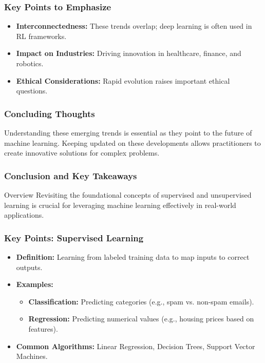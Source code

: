 \documentclass[aspectratio=169]{beamer}
\begin{document}
\begin{frame}[fragile]
    \frametitle{Key Points to Emphasize}
    \begin{itemize}
        \item \textbf{Interconnectedness:} These trends overlap; deep learning is often used in RL frameworks.
        \item \textbf{Impact on Industries:} Driving innovation in healthcare, finance, and robotics.
        \item \textbf{Ethical Considerations:} Rapid evolution raises important ethical questions.
    \end{itemize}
\end{frame}

\begin{frame}[fragile]
    \frametitle{Concluding Thoughts}
    Understanding these emerging trends is essential as they point to the future of machine learning. Keeping updated on these developments allows practitioners to create innovative solutions for complex problems.
\end{frame}

\begin{frame}[fragile]
    \frametitle{Conclusion and Key Takeaways}
    
    \begin{block}{Overview}
        Revisiting the foundational concepts of supervised and unsupervised learning is crucial for leveraging machine learning effectively in real-world applications.
    \end{block}
\end{frame}

\begin{frame}[fragile]
    \frametitle{Key Points: Supervised Learning}
    
    \begin{itemize}
        \item \textbf{Definition:} Learning from labeled training data to map inputs to correct outputs.
        \item \textbf{Examples:}
        \begin{itemize}
            \item \textbf{Classification:} Predicting categories (e.g., spam vs. non-spam emails).
            \item \textbf{Regression:} Predicting numerical values (e.g., housing prices based on features).
        \end{itemize}
        \item \textbf{Common Algorithms:} Linear Regression, Decision Trees, Support Vector Machines.
    \end{itemize}
\end{frame}
\end{document}
